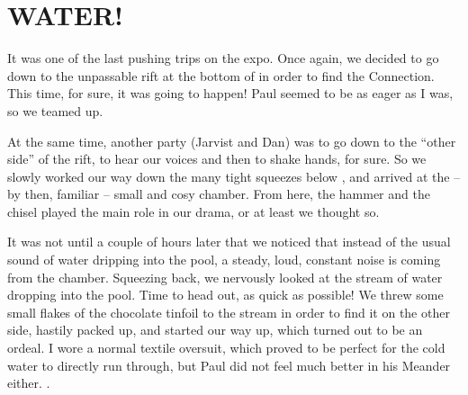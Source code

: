 \section{WATER!}


It was one of the last pushing trips on the expo. Once again, we decided
to go down to the unpassable rift at the bottom of  in order to
find the Connection. This time, for sure, it was going to happen! Paul
seemed to be as eager as I was, so we teamed up.



At the same time, another party (Jarvist and Dan) was to go down to the
``other side'' of the rift, to hear our voices and then to shake hands,
for sure. So we slowly worked our way down the many tight squeezes below
, and arrived at the -- by then, familiar -- small and cosy
chamber. From here, the hammer and the chisel played the main role in
our drama, or at least we thought so.

It was not until a couple of hours later that we noticed that instead of
the usual sound of water dripping into the pool, a steady, loud,
constant noise is coming from the chamber. Squeezing back, we nervously
looked at the stream of water dropping into the pool. Time to head out,
as quick as possible! We threw some small flakes of the chocolate
tinfoil to the stream in order to find it on the other side, hastily
packed up, and started our way up, which turned out to be an ordeal. I
wore a normal textile oversuit, which proved to be perfect for the cold
water to directly run through, but Paul did not feel much better in his
Meander either. .

